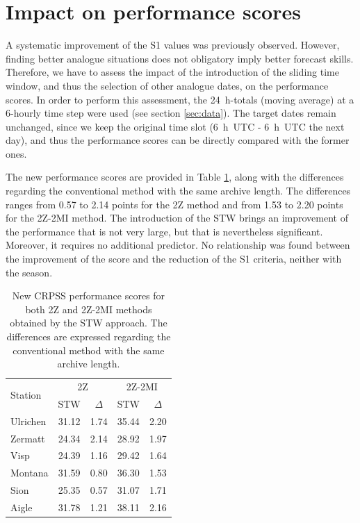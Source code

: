 \documentclass[hess]{copernicus}
\begin{document}
\section{Impact on performance scores}

A systematic improvement of the S1 values was previously observed. However, finding better analogue situations does not obligatory imply better forecast skills. Therefore, we have to assess the impact of the introduction of the sliding time window, and thus the selection of other analogue dates, on the performance scores. In order to perform this assessment, the 24~h-totals (moving average) at a 6-hourly time step were used (see section \ref{sec:data}). The target dates remain unchanged, since we keep the original time slot (6~h~UTC - 6~h~UTC the next day), and thus the performance scores can be directly compared with the former ones.

The new performance scores are provided in Table \ref{table:CRPSS_STW}, along with the differences regarding the conventional method with the same archive length. The differences ranges from 0.57 to 2.14 points for the 2Z method and from 1.53 to 2.20 points for the 2Z-2MI method. The introduction of the STW brings an improvement of the performance that is not very large, but that is nevertheless significant. Moreover, it requires no additional predictor. No relationship was found between the improvement of the score and the reduction of the S1 criteria, neither with the season.

\begin{table}[htb]
	\caption{New CRPSS performance scores for both 2Z and 2Z-2MI methods obtained by the STW approach. The differences are expressed regarding the conventional method with the same archive length.}
	\begin{center}
		\begin{tabular}{l c c c c}
			\hline
			\multirow{2}{*}{Station} & \multicolumn{2}{c}{2Z} & \multicolumn{ 2}{c}{2Z-2MI} \\
			& STW & $\Delta$ & STW & $\Delta$ \\
			\hline
			Ulrichen & 31.12 & 1.74 & 35.44 & 2.20 \\
			Zermatt & 24.34 & 2.14 & 28.92 & 1.97 \\
			Visp & 24.39 & 1.16 & 29.42 & 1.64 \\
			Montana & 31.59 & 0.80 & 36.30 & 1.53 \\
			Sion & 25.35 & 0.57 & 31.07 & 1.71 \\
			Aigle & 31.78 & 1.21 & 38.11 & 2.16 \\ 
			\hline
		\end{tabular}
	\end{center}
	\label{table:CRPSS_STW}
\end{table}
\end{document}
